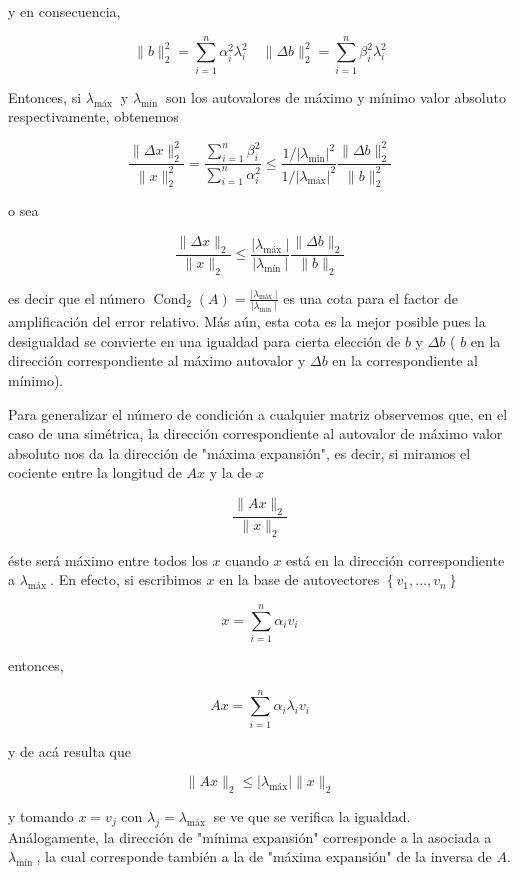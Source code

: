 \documentclass[10pt]{article}
\begin{document}
y en consecuencia,

$$
\|b\|_{2}^{2}=\sum_{i=1}^{n} \alpha_{i}^{2} \lambda_{i}^{2} \quad\|\Delta b\|_{2}^{2}=\sum_{i=1}^{n} \beta_{i}^{2} \lambda_{i}^{2}
$$

Entonces, si $\lambda_{\text {máx }}$ y $\lambda_{\text {mín }}$ son los autovalores de máximo y mínimo valor absoluto respectivamente, obtenemos

$$
\frac{\|\Delta x\|_{2}^{2}}{\|x\|_{2}^{2}}=\frac{\sum_{i=1}^{n} \beta_{i}^{2}}{\sum_{i=1}^{n} \alpha_{i}^{2}} \leq \frac{1 /\left|\lambda_{\min }\right|^{2}}{1 /\left|\lambda_{\operatorname{máx}}\right|^{2}} \frac{\|\Delta b\|_{2}^{2}}{\|b\|_{2}^{2}}
$$

o sea

$$
\frac{\|\Delta x\|_{2}}{\|x\|_{2}} \leq \frac{\left|\lambda_{\text {máx }}\right|}{\left|\lambda_{\text {mín }}\right|} \frac{\|\Delta b\|_{2}}{\|b\|_{2}}
$$

es decir que el número $\operatorname{Cond}_{2}(A)=\frac{\left|\lambda_{\text {máx }}\right|}{\left|\lambda_{\text {mín }}\right|}$ es una cota para el factor de amplificación del error relativo. Más aún, esta cota es la mejor posible pues la desigualdad se convierte en una igualdad para cierta elección de $b$ y $\Delta b$ ( $b$ en la dirección correspondiente al máximo autovalor y $\Delta b$ en la correspondiente al mínimo).

Para generalizar el número de condición a cualquier matriz observemos que, en el caso de una simétrica, la dirección correspondiente al autovalor de máximo valor absoluto nos da la dirección de "máxima expansión", es decir, si miramos el cociente entre la longitud de $A x$ y la de $x$

$$
\frac{\|A x\|_{2}}{\|x\|_{2}}
$$

éste será máximo entre todos los $x$ cuando $x$ está en la dirección correspondiente a $\lambda_{\text {máx }}$. En efecto, si escribimos $x$ en la base de autovectores $\left\{v_{1}, \ldots, v_{n}\right\}$

$$
x=\sum_{i=1}^{n} \alpha_{i} v_{i}
$$

entonces,

$$
A x=\sum_{i=1}^{n} \alpha_{i} \lambda_{i} v_{i}
$$

y de acá resulta que

$$
\|A x\|_{2} \leq\left|\lambda_{\operatorname{máx}}\right|\|x\|_{2}
$$

y tomando $x=v_{j}$ con $\lambda_{j}=\lambda_{\text {máx }}$ se ve que se verifica la igualdad.\\
Análogamente, la dirección de "mínima expansión" corresponde a la asociada a $\lambda_{\text {mín }}$, la cual corresponde también a la de "máxima expansión" de la inversa de $A$.
\end{document}
